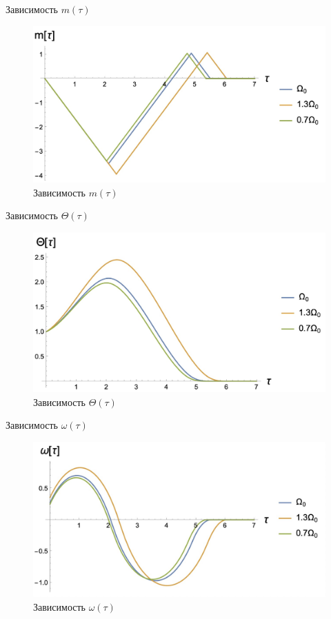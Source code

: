 \documentclass[10pt]{beamer}
\begin{document}
\begin{frame}{Зависимость $m(\tau)$}
	\begin{figure}[h!]
		\centering
		\includegraphics[width=1.0\linewidth]{images/m.jpeg}
		\caption{Зависимость $m(\tau)$}
		\label{fig:m}
	\end{figure}
\end{frame}
\begin{frame}{Зависимость $\Theta(\tau)$}
	\begin{figure}[h!]
		\centering
		\includegraphics[width=1.0\linewidth]{images/theta.jpeg}
		\caption{Зависимость $\Theta(\tau)$}
		\label{fig:theta}
	\end{figure}
\end{frame}
\begin{frame}{Зависимость $\omega(\tau)$}
	\begin{figure}[h!]
		\centering
		\includegraphics[width=1.0\linewidth]{images/omega.jpeg}
		\caption{Зависимость $\omega(\tau)$}
		\label{fig:omega}
	\end{figure}
\end{frame}
\end{document}
